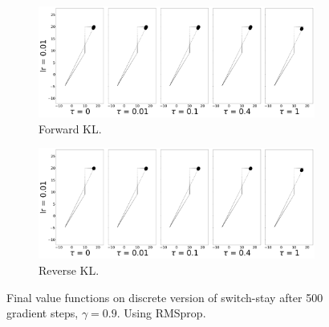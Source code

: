 \documentclass{article}
\begin{document}
\begin{figure}[!htb]
  \centering
  \begin{subfigure}[b]{0.5\linewidth}
    \centering
    \includegraphics[width=0.8\columnwidth]{figs/switch-stay/notlearnQ/polytope_forward_optim=rmsprop.png}
    \caption{Forward KL.}
    \label{fig:switch-stay-forward-rmsprop}
  \end{subfigure}%
  \begin{subfigure}[b]{0.5\linewidth}
        \centering
        \includegraphics[width=0.8\columnwidth]{figs/switch-stay/notlearnQ/polytope_reverse_optim=rmsprop.png}
        \caption{Reverse KL.}
        \label{fig:switch-stay-reverse-rmsprop}
  \end{subfigure}
  \caption{Final value functions on discrete version of switch-stay after 500 gradient steps, $\gamma = 0.9$. Using RMSprop.}
\end{figure}
\end{document}
